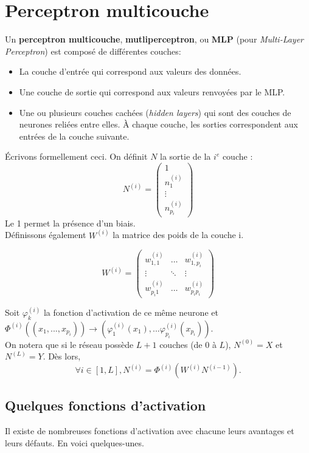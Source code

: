 \section{Perceptron multicouche}
Un \textbf{perceptron multicouche}, \textbf{mutliperceptron}, ou \textbf{MLP} (pour \textit{Multi-Layer Perceptron}) est composé de différentes couches: \begin{itemize}
\item La couche d'entrée qui correspond aux valeurs des données.
\item Une couche de sortie qui correspond aux valeurs renvoyées par le MLP.
\item Une ou plusieurs couches cachées (\textit{hidden layers}) qui sont des couches de neurones reliées entre elles. À chaque couche, les sorties correspondent aux entrées de la couche suivante.

\end{itemize}

Écrivons formellement ceci. On définit $N$ la sortie de la $i^e$ couche :
$$N^{(i)}  = \begin{pmatrix} 1\\ n_1^{(i)}\\ \vdots \\ n_{p_i}^{(i)} \end{pmatrix}$$  Le 1 permet la présence d'un biais.\\ 
Définissons également $W^{(i)}$ la matrice des poids de la couche i.

$$W^{(i)} = \begin{pmatrix} w_{1,1}^{(i)}& \hdots & w_{1, p_i}^{(i)} \\  \vdots & \ddots &  \vdots \\ w_{p_i1}^{(i)} & \hdots & w_{p_ip_i}^{(i)} \end{pmatrix}$$

Soit $\varphi_k^{(i)}$ la fonction d'activation de ce même neurone et $\Phi^{(i)}((x_1,...,x_{p_i})) \to (\varphi_1^{(i)}(x_1), ... \varphi^{(i)}_{p_i}(x_{p_i}))$.\\

On notera que si le réseau possède $L+1$ couches (de $0$ à $ L$), $N^{(0)} = X$ et $N^{(L)} = Y$. Dès lors, $$\forall i \in [1,L], N^{(i)} = \Phi^{(i)}(W^{(i)}N^{(i-1)}). $$





\subsection{Quelques fonctions d'activation}
Il existe de nombreuses fonctions d'activation avec chacune leurs avantages et leurs défauts. En voici quelques-unes.

